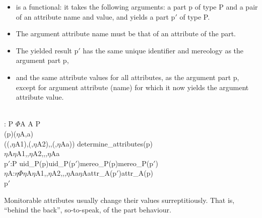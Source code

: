 {\label{Update Attributes}

\begin{itemize}
\item {} is a functional: it takes the following
      arguments: a part \textsf{p} of type \textsf{P} and a pair of an attribute name
      and value, and yields a part \textsf{p$'$} of type \textsf{P}.
\item The argument attribute name must be that of an attribute of the part.
\item The yielded result \textsf{p$'$} has the same unique identifier
  and mereology as the argument part \textsf{p},
\item and the same attribute values for all attributes,
      as the argument part \textsf{p},
\pind except for argument attribute (name) for which it now yields the
      argument attribute value.
\end{itemize}

\bp
{}\\
\>\>: P {\RIGHTARROW} $\Phi$A {\TIMES} A {\RIGHTARROW} P\\
\>\>(p)($\eta$A,a) {\IS}\\
\>\>\>\> (({\UNDERLINE},$\eta$A1),({\UNDERLINE},$\eta$A2),{\DOTDOTDOT},({\UNDERLINE},$\eta$Aa)) {\EQ} determine\_attributes(p) \\
\>\>\>\>\>\> $\eta$A{\ISIN}{\LBRACE}$\eta$A1,,$\eta$A2,{\DOTDOTDOT},,$\eta$Aa{\RBRACE}\\
\>\>\>\> p$'$:P {\RDOT} uid\_P(p){\EQ}uid\_P(p$'$){\WEDGE}mereo\_P(p){\EQ}mereo\_P(p$'$){\WEDGE}\\
\>\>\>\>\>\>{\ALL} $\eta$A:$\eta$$\Phi${\RDOT}$\eta$A{\ISIN}{\LBRACE}$\eta$A1,,$\eta$A2,{\DOTDOTDOT},,$\eta$Aa{\RBRACE}{\SETMINUS}$\eta$A{\DBLRIGHTARROW}attr\_A(p$'$){\EQ}attr\_A(p) \\
\>\>\>\>p$'$  
\ep

\noindent
\begynd
\pind Monitorable attributes usually change their values surreptitiously. 
\begynd
\pind That is, ``behind the back'', so-to-speak, of the part behaviour.
\afslut
\afslut
}%

